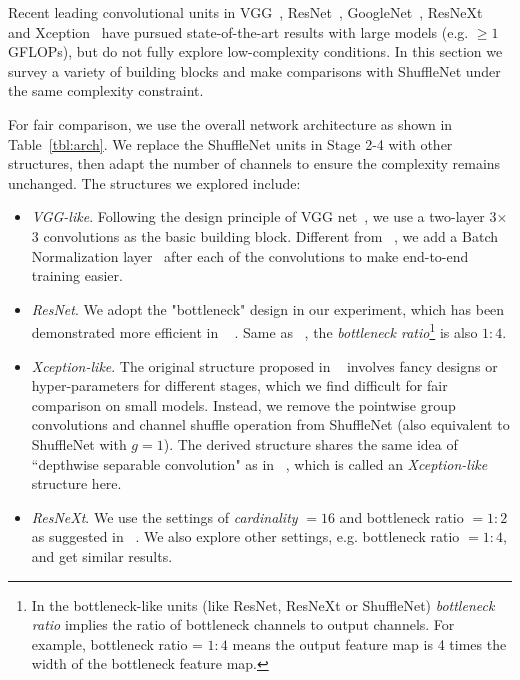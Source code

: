 \documentclass[10pt,twocolumn,letterpaper]{article}
\begin{document}
Recent leading convolutional units in VGG~\cite{simonyan2014very}, ResNet~\cite{he2016deep}, GoogleNet~\cite{szegedy2015going}, ResNeXt~\cite{xie2016aggregated} and Xception~\cite{chollet2016xception} have pursued state-of-the-art results with large models (e.g. $\ge 1$GFLOPs), but do not fully explore low-complexity conditions. In this section we survey a variety of building blocks and make comparisons with ShuffleNet under the same complexity constraint.

For fair comparison, we use the overall network architecture as shown in Table~\ref{tbl:arch}. We replace the ShuffleNet units in Stage 2-4 with other structures, then adapt the number of channels to ensure the complexity remains unchanged. The structures we explored include:

\begin{itemize}

	\item \emph{VGG-like}. Following the design principle of VGG net~\cite{simonyan2014very}, we use a two-layer 3$\times$3 convolutions as the basic building block. Different from ~\cite{simonyan2014very}, we add a Batch Normalization layer~\cite{ioffe2015batch} after each of the convolutions to make end-to-end training easier.
		
	\item \emph{ResNet}. We adopt the "bottleneck" design in our experiment, which has been demonstrated more efficient in ~\cite{he2016deep} . Same as ~\cite{he2016deep}, the \emph{bottleneck ratio}\footnote{In the bottleneck-like units (like ResNet, ResNeXt or ShuffleNet) \emph{bottleneck ratio} implies the ratio of bottleneck channels to output channels. For example, bottleneck ratio = $1:4$ means the output feature map is 4 times the width of the bottleneck feature map. } is also $1:4$. 
	
	\item \emph{Xception-like}. The original structure proposed in ~\cite{chollet2016xception} involves fancy designs or hyper-parameters for different stages, which we find difficult for fair comparison on small models. Instead, we remove the pointwise group convolutions and channel shuffle operation from ShuffleNet (also equivalent to ShuffleNet with $g=1$). The derived structure shares the same idea of ``depthwise separable convolution" as in ~\cite{chollet2016xception}, which is called an \emph{Xception-like} structure here.
	
	\item \emph{ResNeXt}. We use the settings of \emph{cardinality} $=16$ and bottleneck ratio $=1:2$ as suggested in ~\cite{xie2016aggregated}. We also explore other settings, e.g. bottleneck ratio $=1:4$, and get similar results.
	
\end{itemize}
\end{document}
